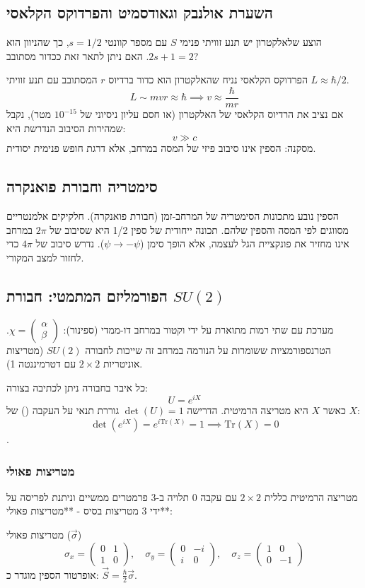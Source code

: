\subsection{השערת אולנבק וגאודסמיט והפרדוקס הקלאסי}
הוצע שלאלקטרון יש תנע זוויתי פנימי $S$ עם מספר קוונטי $s=1/2$, כך שהניוון הוא $2s+1=2$.
האם ניתן לתאר זאת ככדור מסתובב?
\begin{examplebox}{הפרדוקס הקלאסי}
נניח שהאלקטרון הוא כדור ברדיוס $r$ המסתובב עם תנע זוויתי $L \approx \hbar/2$.
\[
L \sim mvr \approx \hbar \implies v \approx \frac{\hbar}{mr}
\]
אם נציב את הרדיוס הקלאסי של האלקטרון (או חסם עליון ניסיוני של $10^{-15}$ מטר), נקבל שמהירות הסיבוב הנדרשת היא:
\[
v \gg c
\]
מסקנה: הספין אינו סיבוב פיזי של המסה במרחב, אלא דרגת חופש פנימית יסודית.
\end{examplebox}

\subsection{סימטריה וחבורת פואנקרה}
הספין נובע מתכונות הסימטריה של המרחב-זמן (חבורת פואנקרה). חלקיקים אלמנטריים מסווגים לפי המסה והספין שלהם.
תכונה ייחודית של ספין 1/2 היא שסיבוב של $2\pi$ במרחב אינו מחזיר את פונקציית הגל לעצמה, אלא הופך סימן ($\psi \to -\psi$). נדרש סיבוב של $4\pi$ כדי לחזור למצב המקורי.

\subsection{הפורמליזם המתמטי: חבורת $SU(2)$}
מערכת עם שתי רמות מתוארת על ידי וקטור במרחב דו-ממדי (ספינור): $\chi = \begin{pmatrix} \alpha \\ \beta \end{pmatrix}$.
הטרנספורמציות ששומרות על הנורמה במרחב זה שייכות לחבורה $SU(2)$ (מטריצות אוניטריות $2\times 2$ עם דטרמיננטה 1).

כל איבר בחבורה ניתן לכתיבה בצורה:
\[
U = e^{iX}
\]
כאשר $X$ היא מטריצה הרמיטית. הדרישה $\det(U)=1$ גוררת תנאי על העקבה () של $X$:
\[
\det(e^{iX}) = e^{i \text{Tr}(X)} = 1 \implies \text{Tr}(X) = 0
\]
.

\subsubsection{מטריצות פאולי}
מטריצה הרמיטית כללית $2\times 2$ עם עקבה 0 תלויה ב-3 פרמטרים ממשיים וניתנת לפריסה על ידי 3 מטריצות בסיס - **מטריצות פאולי**:
\begin{definitionbox}{מטריצות פאולי ($\vec{\sigma}$)}
\begin{equation}
\sigma_x = \begin{pmatrix} 0 & 1 \\ 1 & 0 \end{pmatrix}, \quad
\sigma_y = \begin{pmatrix} 0 & -i \\ i & 0 \end{pmatrix}, \quad
\sigma_z = \begin{pmatrix} 1 & 0 \\ 0 & -1 \end{pmatrix}
\end{equation}
אופרטור הספין מוגדר כ: $\vec{S} = \frac{\hbar}{2}\vec{\sigma}$.
\end{definitionbox}